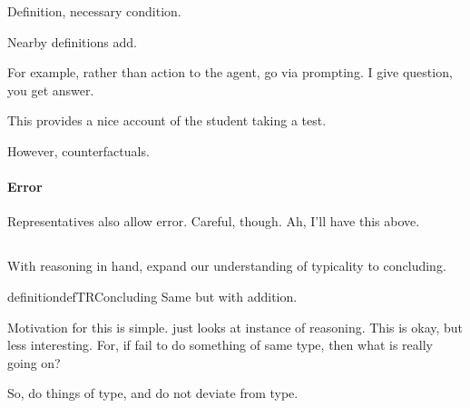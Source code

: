 \begin{note}
  Definition, necessary condition.

  Nearby definitions add.

  For example, rather than action to the agent, go via prompting.
  I give question, you get answer.

  This provides a nice account of the student taking a test.

  However, counterfactuals.
\end{note}

\paragraph{Error}

\begin{note}
  Representatives also allow error.
  Careful, though.
  Ah, I'll have this above.
\end{note}

\subsection{}
\label{cha:typical:sec:sTR}

\begin{note}
  With reasoning in hand, expand our understanding of typicality to concluding.

  \begin{note}
  \begin{restatable}[\tC{2}]{definition}{defTRConcluding}
    Same but with addition.
  \end{restatable}

  Motivation for this is simple.
  \tR{} just looks at instance of reasoning.
  This is okay, but less interesting.
  For, if fail to do something of same type, then what is really going on?

  So, do things of type, and do not deviate from type.
\end{note}

\end{note}



